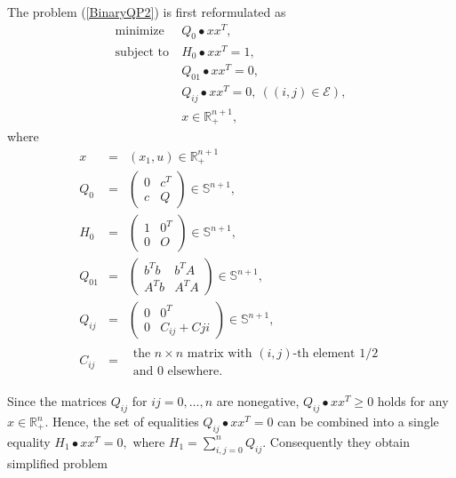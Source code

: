 \documentclass[12pt]{book}
\theoremstyle{definition}
\begin{document}
The problem (\ref{BinaryQP2}) is first reformulated as 
\begin{equation}
\label{BinaryQP2ref}
\begin{array}{ll}
\mbox{minimize}&\  Q_0\bullet xx^T ,\\
\mbox{subject to}&\  H_0\bullet xx^T = 1,\\
				 &\  Q_{01}\bullet xx^T = 0,\\
				 &\ Q_{ij}\bullet xx^T = 0, \ ((i,j)\in \mathcal{E}), \\
				 &\ x\in \mathbb{R}^{n+1}_+, 
\end{array}
\end{equation}
where 
\begin{eqnarray}
x &=& (x_1,u)\in\mathbb{R}^{n+1}_+ \\
Q_0 &=& \left(\begin{array}{rr} 0 & c^T \\ c & Q\end{array}\right) \in\mathbb{S}^{n+1},\\
H_0 &=& \left(\begin{array}{rr} 1 & 0^T \\ 0 & O\end{array}\right) \in\mathbb{S}^{n+1}, \\
Q_{01} &=& \left(\begin{array}{rr} b^Tb & b^TA \\ A^Tb & A^TA\end{array}\right) \in\mathbb{S}^{n+1},\\
Q_{ij} &=& \left(\begin{array}{cc} 0 & 0^T \\ 0 & C_{ij} + C{ji}\end{array}\right) \in\mathbb{S}^{n+1},\\
C_{ij} &=& \begin{array}{l} \mbox{the } n\times n\mbox{ matrix with } (i,j)\mbox{-th element 1/2}\\ \mbox{and 0 elsewhere.} \end{array}
\end{eqnarray}



Since the matrices $Q_{ij}$ for $ij=0,\dots, n$ are nonegative, $Q_{ij}\bullet xx^T\geq 0 $ holds for any $x\in \mathbb{R}^n_+$. Hence, the set of equalities $Q_{ij}\bullet xx^T = 0$ can be combined into a single equality $H_1\bullet xx^T = 0, $ where $H_1 = \sum_{i,j=0}^n Q_{ij}.$
Consequently they obtain simplified problem
\end{document}
